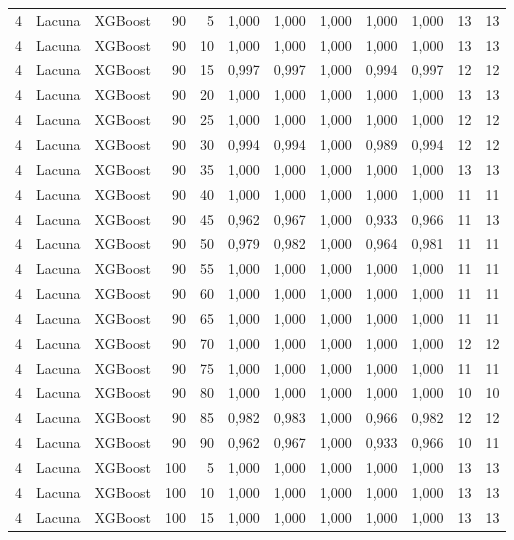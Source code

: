 \begin{longtable}{@{}rllrrrrrrrrr@{}}
4 & Lacuna & XGBoost & 90 & 5 & 1,000 & 1,000 & 1,000 & 1,000 & 1,000 & 13 & 13 \\
4 & Lacuna & XGBoost & 90 & 10 & 1,000 & 1,000 & 1,000 & 1,000 & 1,000 & 13 & 13 \\
4 & Lacuna & XGBoost & 90 & 15 & 0,997 & 0,997 & 1,000 & 0,994 & 0,997 & 12 & 12 \\
4 & Lacuna & XGBoost & 90 & 20 & 1,000 & 1,000 & 1,000 & 1,000 & 1,000 & 13 & 13 \\
4 & Lacuna & XGBoost & 90 & 25 & 1,000 & 1,000 & 1,000 & 1,000 & 1,000 & 12 & 12 \\
4 & Lacuna & XGBoost & 90 & 30 & 0,994 & 0,994 & 1,000 & 0,989 & 0,994 & 12 & 12 \\
4 & Lacuna & XGBoost & 90 & 35 & 1,000 & 1,000 & 1,000 & 1,000 & 1,000 & 13 & 13 \\
4 & Lacuna & XGBoost & 90 & 40 & 1,000 & 1,000 & 1,000 & 1,000 & 1,000 & 11 & 11 \\
4 & Lacuna & XGBoost & 90 & 45 & 0,962 & 0,967 & 1,000 & 0,933 & 0,966 & 11 & 13 \\
4 & Lacuna & XGBoost & 90 & 50 & 0,979 & 0,982 & 1,000 & 0,964 & 0,981 & 11 & 11 \\
4 & Lacuna & XGBoost & 90 & 55 & 1,000 & 1,000 & 1,000 & 1,000 & 1,000 & 11 & 11 \\
4 & Lacuna & XGBoost & 90 & 60 & 1,000 & 1,000 & 1,000 & 1,000 & 1,000 & 11 & 11 \\
4 & Lacuna & XGBoost & 90 & 65 & 1,000 & 1,000 & 1,000 & 1,000 & 1,000 & 11 & 11 \\
4 & Lacuna & XGBoost & 90 & 70 & 1,000 & 1,000 & 1,000 & 1,000 & 1,000 & 12 & 12 \\
4 & Lacuna & XGBoost & 90 & 75 & 1,000 & 1,000 & 1,000 & 1,000 & 1,000 & 11 & 11 \\
4 & Lacuna & XGBoost & 90 & 80 & 1,000 & 1,000 & 1,000 & 1,000 & 1,000 & 10 & 10 \\
4 & Lacuna & XGBoost & 90 & 85 & 0,982 & 0,983 & 1,000 & 0,966 & 0,982 & 12 & 12 \\
4 & Lacuna & XGBoost & 90 & 90 & 0,962 & 0,967 & 1,000 & 0,933 & 0,966 & 10 & 11 \\
4 & Lacuna & XGBoost & 100 & 5 & 1,000 & 1,000 & 1,000 & 1,000 & 1,000 & 13 & 13 \\
4 & Lacuna & XGBoost & 100 & 10 & 1,000 & 1,000 & 1,000 & 1,000 & 1,000 & 13 & 13 \\
4 & Lacuna & XGBoost & 100 & 15 & 1,000 & 1,000 & 1,000 & 1,000 & 1,000 & 13 & 13 \\

\end{longtable}
